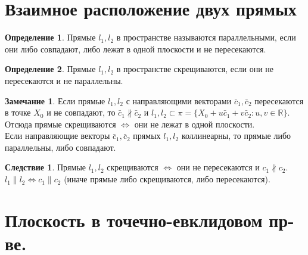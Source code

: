 \documentclass[a4paper, 12pt]{article}
\theoremstyle{definition}
\newtheorem*{definition}{Определение}
\newtheorem*{consequense}{Следствие}
\newtheorem*{remark}{Замечание}
\begin{document}
	\section{Взаимное расположение двух прямых}
	\begin{definition}
		Прямые $l_1, l_2$ в пространстве называются параллельными, если они либо совпадают, либо лежат в одной плоскости и не пересекаются. 
	\end{definition}
	\begin{definition}
		Прямые $l_1, l_2$ в пространстве скрещиваются, если они не пересекаются и не параллельны. 
	\end{definition}
	\begin{remark}
		Если прямые $l_1, l_2$ с направляющими векторами $\bar{c}_1, \bar{c}_2$ пересекаются в точке $X_0$ и не совпадают, то $\bar{c}_1 \nparallel \bar{c}_2$ и $l_1, l_2 \subset \pi = \{X_0 + u\bar{c}_1 + v\bar{c}_2: u, v \in\mathbb{R}\}$. Отсюда прямые скрещиваются $\Leftrightarrow$ они не лежат в одной плоскости.\\
		Если направляющие векторы $\bar{c}_1, \bar{c}_2$ прямых $l_1, l_2$ коллинеарны, то прямые либо параллельны, либо совпадают. 
	\end{remark}
	\begin{consequense}
		Прямые $l_1, l_2$ скрещиваются $\Leftrightarrow$ они не пересекаются и $c_1 \nparallel c_2$.\\
		$l_1 \parallel l_2 \Leftrightarrow c_1 \parallel c_2$ (иначе прямые либо скрещиваются, либо пересекаются).
	\end{consequense}
	\section{Плоскость в точечно-евклидовом пр-ве.}
\end{document}
